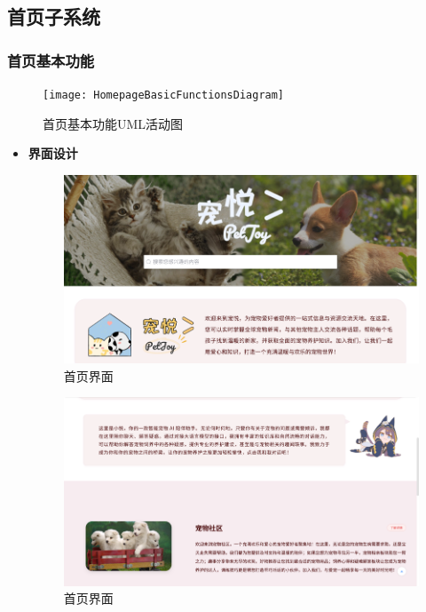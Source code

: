 \subsection{首页子系统}

\subsubsection{首页基本功能}

\begin{figure}[H]
	\centering
	\texttt{[image: HomepageBasicFunctionsDiagram]} 
	\caption{首页基本功能UML活动图}
	\label{fig:HomepageBasicFunctionsDiagram}
\end{figure}

\begin{itemize}
	\item \textbf{界面设计}

	\begin{figure}[H]
		\centering
		\includegraphics[scale=0.8]{figures/HomepageBasicFunctions1.png} 
		\caption{首页界面}
	\end{figure}

	\begin{figure}[H]
		\centering
		\includegraphics[scale=0.8]{figures/HomepageBasicFunctions2.png} 
		\caption{首页界面}
	\end{figure}


\end{itemize}
